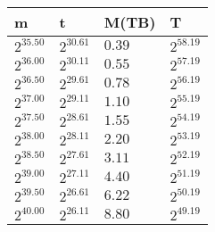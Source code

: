 \begin{tabular}{llll}
m & t & M(TB) & T \\ \hline
$2^{35.50}$ & $2^{30.61}$ & $0.39$ & $2^{58.19}$ \\
$2^{36.00}$ & $2^{30.11}$ & $0.55$ & $2^{57.19}$ \\
$2^{36.50}$ & $2^{29.61}$ & $0.78$ & $2^{56.19}$ \\
$2^{37.00}$ & $2^{29.11}$ & $1.10$ & $2^{55.19}$ \\
$2^{37.50}$ & $2^{28.61}$ & $1.55$ & $2^{54.19}$ \\
$2^{38.00}$ & $2^{28.11}$ & $2.20$ & $2^{53.19}$ \\
$2^{38.50}$ & $2^{27.61}$ & $3.11$ & $2^{52.19}$ \\
$2^{39.00}$ & $2^{27.11}$ & $4.40$ & $2^{51.19}$ \\
$2^{39.50}$ & $2^{26.61}$ & $6.22$ & $2^{50.19}$ \\
$2^{40.00}$ & $2^{26.11}$ & $8.80$ & $2^{49.19}$ \\
\end{tabular}

